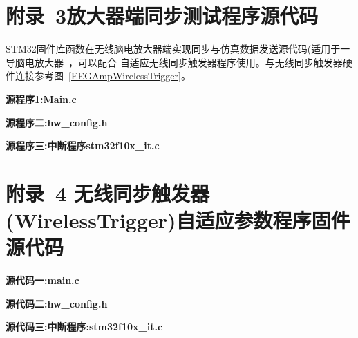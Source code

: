 \section*{附录~3\quad 放大器端同步测试程序源代码}
STM32固件库函数在无线脑电放大器端实现同步与仿真数据发送源代码(适用于一导脑电放大器~\cite{Xu2009}，可以配合 自适应无线同步触发器程序使用。与无线同步触发器硬件连接参考图~\ref{EEGAmpWirelessTrigger}。

\textbf{源程序1:Main.c}
		
\textbf{源程序二:hw\_{}config.h}



\textbf{源程序三:中断程序stm32f10x\_{}it.c}



\section*{附录~4 \quad 无线同步触发器(WirelessTrigger)自适应参数程序固件源代码}
\label{appendix}

\textbf{源代码一:main.c}



\textbf{源代码二:hw\_{}config.h}



\textbf{源代码三:中断程序:stm32f10x\_{}it.c}


\newpage
